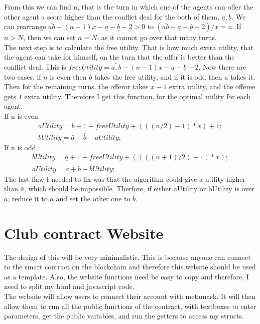 From this we can find n, that is the turn in which one of the agents can offer the other agent a score higher than the conflict deal for the both of them, ${\underline{a},\underline{b}}$. We can rearrange $\bar{ab} - (n-1)x - \underline{a} - \underline{b} - 2 > 0$ to $(\bar{ab} - \underline{a} - \underline{b} - 2) / x = n$. If $n > N$, then we can set $n = N$, as it cannot go over that many turns.
\\
The next step is to calculate the free utility. That is how much extra utility, that the agent can take for himself, on the turn that the offer is better than the conflict deal. This is $freeUtility = \bar{a,b} - (n-1)x - \underline{a} - \underline{b} - 2$. Now there are two cases, if $n$ is even then $b$ takes the free utility, and if it is odd then $a$ takes it. Then for the remaining turns, the offeror takes $x -1$ extra utility, and the offeree gets $1$ extra utility. Therefore I get this function, for the optimal utility for each agent. \\
If n is even
\begin{gather*}
     aUtility = \underline{b} + 1 + freeUtility + (((n/ 2)-1) * x) + 1; \\
     bUtility = \bar{a} + \bar{b} -  aUtility; 
\end{gather*}
If n is odd
\begin{gather*}
      bUtility = \underline{a}  + 1 + freeUtility +  ((((n + 1)/ 2)-1) * x); \\
      aUtility = \bar{a} + \bar{b} -  bUtility;
 \end{gather*}
The last flaw I needed to fix was that the algorithm could give a utility higher than $\bar{a}$, which should be impossible. Therfore, if either aUtility or bUtility is over $\bar{a}$, reduce it to $\bar{a}$ and set the other one to $\bar{b}$.
\section{Club contract Website}
The design of this will be very minimalistic. This is because anyone can connect to the smart contract on the blockchain and therefore this website should be used as a template. Also, the website functions need be easy to copy and therefore, I need to split my html and javascript code. \\
The website will allow users to connect their account with metamask. It will then allow them to run all the public functions of the contract, with textboxes to enter parameters, get the public variables, and run the getters to access my structs.







